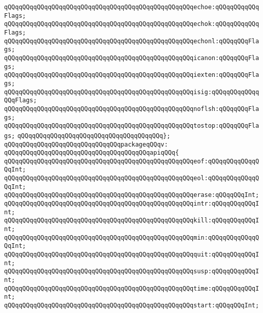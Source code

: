 \verb|qQQqqQQqqQQqqQQqqQQqqQQqqQQqqQQqqQQqqQQqqQQqqQQqqQQqechoe:qQQqqQQqqQQqFlags;|\newline
\verb|qQQqqQQqqQQqqQQqqQQqqQQqqQQqqQQqqQQqqQQqqQQqqQQqqQQqechok:qQQqqQQqqQQqFlags;|\newline
\verb|qQQqqQQqqQQqqQQqqQQqqQQqqQQqqQQqqQQqqQQqqQQqqQQqqQQqechonl:qQQqqQQqFlags;|\newline
\verb|qQQqqQQqqQQqqQQqqQQqqQQqqQQqqQQqqQQqqQQqqQQqqQQqqQQqicanon:qQQqqQQqFlags;|\newline
\verb|qQQqqQQqqQQqqQQqqQQqqQQqqQQqqQQqqQQqqQQqqQQqqQQqqQQqiexten:qQQqqQQqFlags;|\newline
\verb|qQQqqQQqqQQqqQQqqQQqqQQqqQQqqQQqqQQqqQQqqQQqqQQqqQQqisig:qQQqqQQqqQQqqQQqFlags;|\newline
\verb|qQQqqQQqqQQqqQQqqQQqqQQqqQQqqQQqqQQqqQQqqQQqqQQqqQQqnoflsh:qQQqqQQqFlags;|\newline
\verb|qQQqqQQqqQQqqQQqqQQqqQQqqQQqqQQqqQQqqQQqqQQqqQQqqQQqtostop:qQQqqQQqFlags;|\newline
\verb|qQQqqQQqqQQqqQQqqQQqqQQqqQQqqQQqqQQqqQQq};|\newline
\newline
\verb|qQQqqQQqqQQqqQQqqQQqqQQqqQQqqQQqpackageqQQqv:|\newline
\verb|qQQqqQQqqQQqqQQqqQQqqQQqqQQqqQQqqQQqqQQqapiqQQq{|\newline
\verb|qQQqqQQqqQQqqQQqqQQqqQQqqQQqqQQqqQQqqQQqqQQqqQQqqQQqeof:qQQqqQQqqQQqqQQqInt;|\newline
\verb|qQQqqQQqqQQqqQQqqQQqqQQqqQQqqQQqqQQqqQQqqQQqqQQqqQQqeol:qQQqqQQqqQQqqQQqInt;|\newline
\verb|qQQqqQQqqQQqqQQqqQQqqQQqqQQqqQQqqQQqqQQqqQQqqQQqqQQqerase:qQQqqQQqInt;|\newline
\verb|qQQqqQQqqQQqqQQqqQQqqQQqqQQqqQQqqQQqqQQqqQQqqQQqqQQqintr:qQQqqQQqqQQqInt;|\newline
\verb|qQQqqQQqqQQqqQQqqQQqqQQqqQQqqQQqqQQqqQQqqQQqqQQqqQQqkill:qQQqqQQqqQQqInt;|\newline
\verb|qQQqqQQqqQQqqQQqqQQqqQQqqQQqqQQqqQQqqQQqqQQqqQQqqQQqmin:qQQqqQQqqQQqqQQqInt;|\newline
\verb|qQQqqQQqqQQqqQQqqQQqqQQqqQQqqQQqqQQqqQQqqQQqqQQqqQQqquit:qQQqqQQqqQQqInt;|\newline
\verb|qQQqqQQqqQQqqQQqqQQqqQQqqQQqqQQqqQQqqQQqqQQqqQQqqQQqsusp:qQQqqQQqqQQqInt;|\newline
\verb|qQQqqQQqqQQqqQQqqQQqqQQqqQQqqQQqqQQqqQQqqQQqqQQqqQQqtime:qQQqqQQqqQQqInt;|\newline
\verb|qQQqqQQqqQQqqQQqqQQqqQQqqQQqqQQqqQQqqQQqqQQqqQQqqQQqstart:qQQqqQQqInt;|\newline
